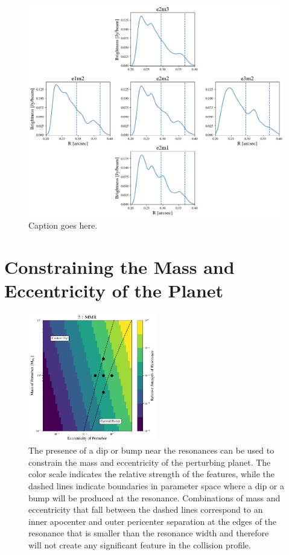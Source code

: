 \documentclass[twocolumn]{aastex63}
\begin{document}
\begin{figure}
    \includegraphics[width=\textwidth]{figures/alma_profiles.png}
    \caption{Caption goes here.\label{fig:alma_profiles}}
\end{figure}

\section{Constraining the Mass and Eccentricity of the Planet}\label{sec:constrain}

\begin{figure}
\begin{center}
    \includegraphics[width=0.5\textwidth]{figures/bump_dip_diag.png}
    \caption{The presence of a dip or bump near the resonances can be used to constrain the mass and eccentricity
    of the perturbing planet. The color scale indicates the relative strength of the features, while the dashed lines
    indicate boundaries in parameter space where a dip or a bump will be produced at the resonance. Combinations of mass and eccentricity that fall 
    between the dashed lines correspond to an inner apocenter and outer pericenter separation at the edges of the resonance that is smaller than the 
    resonance width and therefore will not create any significant feature in the collision profile.\label{fig:bump_dip_diag}}
\end{center}
\end{figure}
\end{document}
